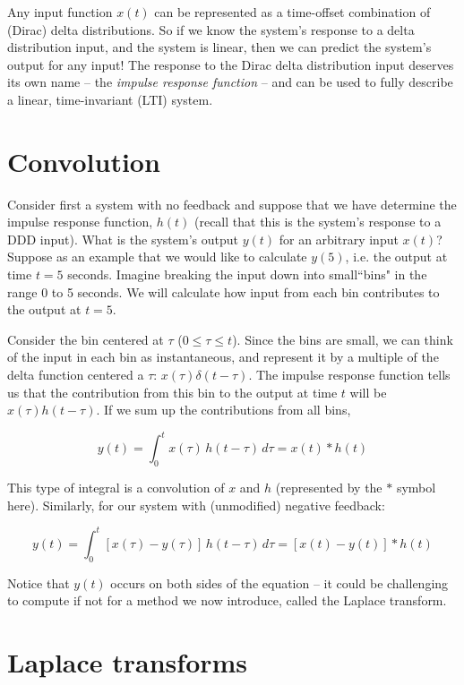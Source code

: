 \documentclass{article}
\begin{document}
Any input function $x(t)$ can be represented as a time-offset combination of (Dirac) delta distributions. So if we know the system's response to a delta distribution input, and the system is linear, then we can predict the system's output for any input! The response to the Dirac delta distribution input deserves its own name -- the \textit{impulse response function} -- and can be used to fully describe a linear, time-invariant (LTI) system.

\section*{Convolution}

Consider first a system with no feedback and suppose that we have determine the impulse response function, $h(t)$ (recall that this is the system's response to a DDD input). What is the system's output $y(t)$ for an arbitrary input $x(t)$?\\

Suppose as an example that we would like to calculate $y(5)$, i.e. the output at time $t=5$ seconds. Imagine breaking the input down into small``bins" in the range 0 to 5 seconds. We will calculate how input from each bin contributes to the output at $t=5$.

Consider the bin centered at $\tau$ ($0 \leq \tau \leq t$). Since the bins are small, we can think of the input in each bin as instantaneous, and represent it by a multiple of the delta function centered a $\tau$: $x(\tau)\delta(t-\tau)$. The impulse response function tells us that the contribution from this bin to the output at time $t$ will be $x(\tau)h(t-\tau)$. If we sum up the contributions from all bins, 

\[ y(t) = \int_0^t x(\tau) \, h(t - \tau) \, d\tau  = x(t) \ast h(t) \]

This type of integral is a convolution of $x$ and $h$ (represented by the $\ast$ symbol here). Similarly, for our system with (unmodified) negative feedback:

\[ y(t) = \int_0^t \left[ x(\tau) - y(\tau) \right] \, h(t - \tau) \, d\tau  = \left[ x(t) - y(t) \right] \ast h(t) \]

Notice that $y(t)$ occurs on both sides of the equation -- it could be challenging to compute if not for a method we now introduce, called the Laplace transform.

\section*{Laplace transforms}
\end{document}
